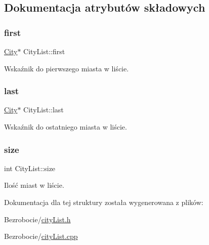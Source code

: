 \subsection{Dokumentacja atrybutów składowych}
\mbox{\label{struct_city_list_ac1a011a48ce943c37ba9464f74670849}} 
\subsubsection{\texorpdfstring{first}{first}}
{\footnotesize\ttfamily \mbox{\hyperlink{struct_city}{City}}$\ast$ City\+List\+::first}



Wskaźnik do pierwszego miasta w liście. 

\mbox{\label{struct_city_list_a924d5ffe21353b51e6114d0eddaf3fed}} 
\subsubsection{\texorpdfstring{last}{last}}
{\footnotesize\ttfamily \mbox{\hyperlink{struct_city}{City}}$\ast$ City\+List\+::last}



Wskaźnik do ostatniego miasta w liście. 

\mbox{\label{struct_city_list_a7f2a7190a909510150705a1b1be9e101}} 
\subsubsection{\texorpdfstring{size}{size}}
{\footnotesize\ttfamily int City\+List\+::size}



Ilość miast w liście. 



Dokumentacja dla tej struktury została wygenerowana z plików\+:\begin{DoxyCompactItemize}
\item 
Bezrobocie/\mbox{\hyperlink{city_list_8h}{city\+List.\+h}}\item 
Bezrobocie/\mbox{\hyperlink{city_list_8cpp}{city\+List.\+cpp}}\end{DoxyCompactItemize}
